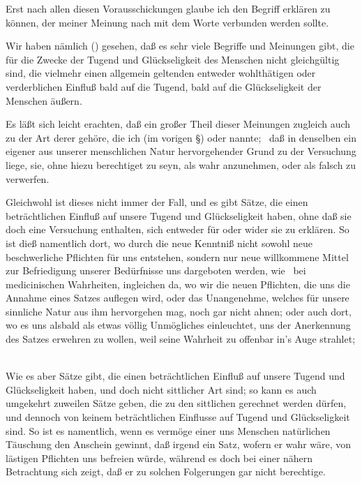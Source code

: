Erst nach allen diesen Vorausschickungen glaube ich den Begriff erklären zu können, der meiner Meinung nach mit dem Worte  verbunden werden sollte.
\begin{aufza}
\item Wir haben nämlich () gesehen, daß es sehr viele Begriffe und Meinungen gibt, die für die Zwecke der Tugend und Glückseligkeit des Menschen nicht gleichgültig sind, die vielmehr einen allgemein geltenden entweder wohlthätigen oder verderblichen Einfluß bald auf die Tugend, bald auf die Glückseligkeit der Menschen äußern.
\item Es läßt sich leicht erachten, daß ein großer Theil dieser Meinungen zugleich auch zu der Art derer gehöre, die ich (im vorigen §)  oder  nannte; \dh\ daß in denselben ein eigener aus unserer menschlichen Natur hervorgehender Grund zu der Versuchung liege, sie, ohne hiezu berechtiget zu seyn, als wahr anzunehmen, oder als falsch zu verwerfen.
\item Gleichwohl ist dieses nicht immer der Fall, und es gibt Sätze, die einen beträchtlichen Einfluß auf unsere Tugend und Glückseligkeit haben, ohne daß sie doch eine Versuchung enthalten, sich entweder für oder wider sie zu erklären. So ist dieß namentlich dort, wo durch die neue Kenntniß nicht sowohl neue beschwerliche Pflichten für uns entstehen, sondern nur neue willkommene Mittel zur Befriedigung unserer Bedürfnisse uns dargeboten werden, wie \zB\ bei medicinischen Wahrheiten, ingleichen da, wo wir die neuen Pflichten, die uns die Annahme eines Satzes auflegen wird, oder das Unangenehme, welches für unsere sinnliche Natur aus ihm hervorgehen mag, noch gar nicht ahnen; oder auch dort, wo es uns alsbald als etwas völlig Unmögliches einleuchtet, uns der Anerkennung des Satzes erwehren zu wollen, weil seine Wahrheit zu offenbar in's Auge strahlet; \udgl\
\item Wie es aber Sätze gibt, die einen beträchtlichen Einfluß auf unsere Tugend und Glückseligkeit haben, und doch nicht sittlicher Art sind; so kann es auch umgekehrt zuweilen Sätze geben, die zu den sittlichen gerechnet werden dürfen, und dennoch von keinem beträchtlichen Einflusse auf Tugend und Glückseligkeit sind. So ist es namentlich, wenn es vermöge einer uns Menschen natürlichen Täuschung den Anschein gewinnt, daß irgend ein Satz, wofern er wahr wäre, von lästigen Pflichten uns befreien würde, während es doch bei einer nähern Betrachtung sich zeigt, daß er zu solchen Folgerungen gar nicht berechtige.

\end{aufza}
